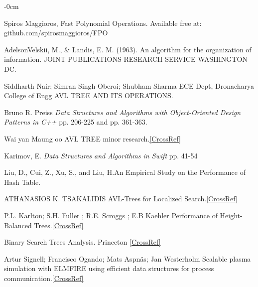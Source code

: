 \documentclass[journal,article,submit,moreauthors,algorithms]{Definitions/mdpi}
\begin{document}
\begin{adjustwidth}{-\extralength}{0cm}


\begin{thebibliography}{999}
Spiros Maggioros, Fast Polynomial Operations. Available free at: github.com/spirosmaggioros/FPO

 AdelsonVelskii, M., \& Landis, E. M. (1963). An algorithm for the organization of information. JOINT PUBLICATIONS RESEARCH SERVICE WASHINGTON DC.

Siddharth Nair; Simran Singh Oberoi; Shubham Sharma ECE Dept, Dronacharya College of Engg AVL TREE AND ITS OPERATIONS.

 Bruno R. Preiss \textit{Data Structures and Algorithms with Object-Oriented Design Patterns in C++} pp. 206-225 and pp. 361-363.

Wai yan Maung oo AVL TREE minor research.\href{https://www.academia.edu/35803329/AVL_TREE_minor_research_docx}{[CrossRef]}

 Karimov, E. \textit{Data Structures and Algorithms in Swift} pp. 41-54

Liu, D., Cui, Z., Xu, S., and Liu, H.An Empirical Study on the Performance of Hash Table.

ATHANASIOS K. TSAKALIDIS AVL-Trees for Localized Search.\href{https://www.sciencedirect.com/science/article/pii/S0019995885800346}{[CrossRef]}

P.L. Karlton; S.H. Fuller ; R.E. Scroggs ; E.B Kaehler Performance of Height-Balanced Trees.\href{https://www.semanticscholar.org/paper/Performance-of-height-balanced-trees-Karlton-Fuller/0c55c77491131897059f4052136b33fb3d119d63}{[CrossRef]}

 Binary Search Trees Analysis. Princeton \href{https://algs4.cs.princeton.edu/32bst/index.php}{[CrossRef]}

Artur Signell; Francisco Ogando; Mats Aspnäs; Jan Westerholm Scalable plasma simulation with ELMFIRE using efficient data structures for process communication.\href{http://users.abo.fi/jan.westerholm/JW-46.pdf}{[CrossRef]}


\end{thebibliography}
\end{adjustwidth}
\end{document}
